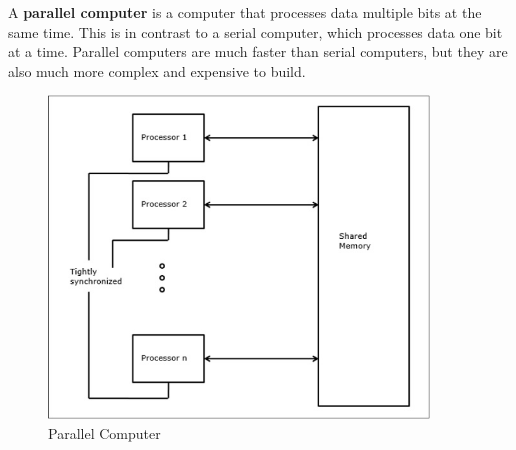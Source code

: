 \begin{minipage}[t]{0.45\textwidth}
    \vspace{1cm}
    A \textbf{parallel computer} is a computer that processes data multiple bits at the same time. This is in contrast to a serial computer, which processes data one bit at a time. Parallel computers are much faster than serial computers, but they are also much more complex and expensive to build.
\end{minipage}
\begin{minipage}[t]{0.45\textwidth}
    \begin{figure}[H]
        \centering
        \includegraphics[width=0.9\textwidth]{assets/fig17.jpg}
        \caption{Parallel Computer}
    \end{figure}
\end{minipage}

